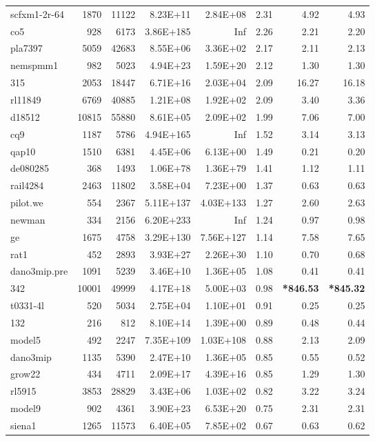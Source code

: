 \documentclass[10pt]{article}
\newcommand{\red}{
	\color{red}	
	}
\begin{document}
\begin{longtable}{|l|r|r|r|r|r|r|r|}
scfxm1-2r-64	&	1870	&	11122	&	8.23E+11	&	2.84E+08	&	2.31	&	4.92	&	4.93	\\
co5	&	928	&	6173	&	3.86E+185	&	Inf	&	2.26	&	2.21	&	2.20	\\
pla7397	&	5059	&	42683	&	8.55E+06	&	3.36E+02	&	2.17	&	2.11	&	2.13	\\
nemspmm1	&	982	&	5023	&	4.94E+23	&	1.59E+20	&	2.12	&	1.30	&	1.30	\\
315	&	2053	&	18447	&	6.71E+16	&	2.03E+04	&	2.09	&	16.27	&	16.18	\\
rl11849	&	6769	&	40885	&	1.21E+08	&	1.92E+02	&	2.09	&	3.40	&	3.36	\\
d18512	&	10815	&	55880	&	8.61E+05	&	2.09E+02	&	1.99	&	7.06	&	7.00	\\
cq9	&	1187	&	5786	&	4.94E+165	&	Inf	&	1.52	&	3.14	&	3.13	\\
qap10	&	1510	&	6381	&	4.45E+06	&	6.13E+00	&	1.49	&	0.21	&	0.20	\\
de080285	&	368	&	1493	&	1.06E+78	&	1.36E+79	&	1.41	&	1.12	&	1.11	\\
rail4284	&	2463	&	11802	&	3.58E+04	&	7.23E+00	&	1.37	&	0.63	&	0.63	\\
pilot.we	&	554	&	2367	&	5.11E+137	&	4.03E+133	&	1.27	&	2.60	&	2.63	\\
newman	&	334	&	2156	&	6.20E+233	&	Inf	&	1.24	&	0.97	&	0.98	\\
ge	&	1675	&	4758	&	3.29E+130	&	7.56E+127	&	1.14	&	7.58	&	7.65	\\
rat1	&	452	&	2893	&	3.93E+27	&	2.26E+30	&	1.10	&	0.70	&	0.68	\\
dano3mip.pre	&	1091	&	5239	&	3.46E+10	&	1.36E+05	&	1.08	&	0.41	&	0.41	\\
342	&	10001	&	49999	&	4.17E+18	&	5.00E+03	&	0.98	&	{\bf \red *846.53} 	&	{\bf \red *845.32}	\\
t0331-4l	&	520	&	5034	&	2.75E+04	&	1.10E+01	&	0.91	&	0.25	&	0.25	\\
132	&	216	&	812	&	8.10E+14	&	1.39E+00	&	0.89	&	0.48	&	0.44	\\
model5	&	492	&	2247	&	7.35E+109	&	1.03E+108	&	0.88	&	2.13	&	2.09	\\
dano3mip	&	1135	&	5390	&	2.47E+10	&	1.36E+05	&	0.85	&	0.55	&	0.52	\\
grow22	&	434	&	4711	&	2.09E+17	&	4.39E+16	&	0.85	&	1.29	&	1.30	\\
rl5915	&	3853	&	28829	&	3.43E+06	&	1.03E+02	&	0.82	&	3.22	&	3.24	\\
model9	&	902	&	4361	&	3.90E+23	&	6.53E+20	&	0.75	&	2.31	&	2.31	\\
siena1	&	1265	&	11573	&	6.40E+05	&	7.85E+02	&	0.67	&	0.63	&	0.62	\\

\end{longtable}
\end{document}
